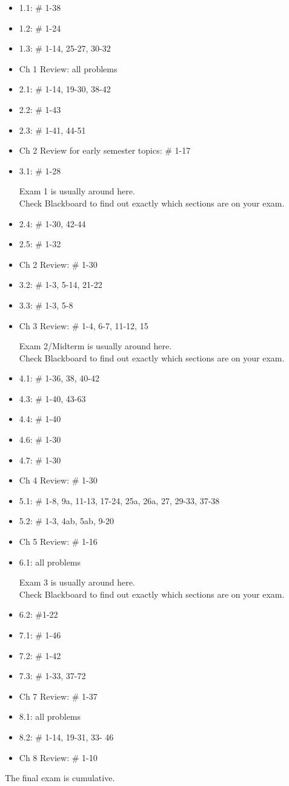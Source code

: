 \documentclass{article}
\begin{document}
\begin{itemize}
\item 1.1:  \# 1-38
\item 1.2:  \# 1-24
\item 1.3:  \# 1-14, 25-27, 30-32
\item Ch 1 Review:  all problems
\item 2.1:  \# 1-14, 19-30, 38-42
\item 2.2:  \# 1-43
\item 2.3:  \# 1-41, 44-51
\item Ch 2 Review for early semester topics: \# 1-17
\item 3.1: \# 1-28
\begin{center}
Exam 1 is usually around here.\\  Check Blackboard to find out exactly which sections are on your exam.
\end{center}
\item 2.4:  \# 1-30, 42-44
\item 2.5: \# 1-32
\item Ch 2 Review: \# 1-30
\item 3.2: \# 1-3, 5-14, 21-22
\item 3.3: \# 1-3, 5-8
\item Ch 3 Review: \# 1-4, 6-7, 11-12, 15
\begin{center}
Exam 2/Midterm is usually around here.\\  Check Blackboard to find out exactly which sections are on your exam.
\end{center}
\newpage\thispagestyle{empty}
\item 4.1:  \# 1-36, 38, 40-42
\item 4.3: \# 1-40, 43-63
\item 4.4: \# 1-40
\item 4.6: \# 1-30
\item 4.7: \# 1-30
\item Ch 4 Review: \# 1-30 
\item 5.1: \# 1-8, 9a, 11-13, 17-24, 25a, 26a, 27, 29-33, 37-38
\item 5.2: \# 1-3, 4ab, 5ab, 9-20
\item Ch 5 Review: \# 1-16
\item 6.1: all problems
\begin{center}
Exam 3 is usually around here.\\  Check Blackboard to find out exactly which sections are on your exam.
\end{center}
\item 6.2: \#1-22
\item 7.1: \# 1-46
\item 7.2: \# 1-42
\item 7.3: \# 1-33, 37-72
\item Ch 7 Review: \# 1-37
\item 8.1: all problems
\item 8.2:  \# 1-14, 19-31, 33- 46
\item Ch 8 Review: \# 1-10
\end{itemize}
\begin{center}
The final exam is cumulative.
\end{center}
\end{document}
